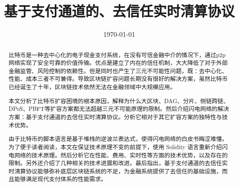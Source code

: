 \documentclass[lang=cn,headings=optiontohead]{elegantpaper}
\title{基于支付通道的、去信任实时清算协议}
\institute{OK区块链工程院}
\date{\today}
\begin{document}
\maketitle

\begin{abstract}

比特币是一种去中心化的电子现金支付系统，在没有可信金融中介的情况下，通过p2p网络实现了安全可靠的价值传输。优点是建立了内在的信任机制，大大降低了对于外部金融监管、风险控制的依赖性。但是同时也产生了三元不可能性问题，既：去中心化、性能、成本三者不可兼得。导致区块链扩容问题长期没有很好的解决方案，虽然比特币已经诞生了十年，区块链技术依然无法在金融领域中大规模应用。

本文分析了比特币扩容困境的根本原因，解释为什么大区块、DAG、分片、侧链跨链、DPoS、PBFT等扩容方案都无法超越三元不可能原理的限制。然后介绍闪电网络的解决方案：基于支付通道的去信任实时清算协议。分析它相对于其它扩容方案的独特性与技术优势。

由于比特币的脚本语言是基于堆栈的逆波兰表达式，使得闪电网络的白皮书晦涩难懂。为了便于读者阅读，本文在保证技术原理不变的前提下，使用 Solidity 语言重新介绍闪电网络的技术原理。然后分析它在性能、费用、实时性等方面的技术优势，以及存在的限制。另外还介绍了几种相关的技术进展和改进。最后指出，基于支付通道的去信任实时清算协议能够弥补底层区块链系统的不足，为金融系统提供了去信任的基础设施，而且能够满足现代支付体系的性能需求。

\end{abstract}

\newpage

\tableofcontents

\lstlistoflistings

\newpage







\end{document}
